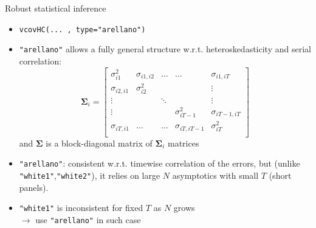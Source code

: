 \documentclass{beamer}
\begin{document}
\begin{frame}{Robust statistical inference}
\begin{itemize}
    \item \texttt{vcovHC(... , type="arellano")}
    \medskip
    \item \texttt{"arellano"} allows a fully general structure w.r.t. heteroskedasticity and serial correlation:
    $$
    \bm{\Sigma}_i = 
    \begin{bmatrix}
    \sigma_{i1}^2 & \sigma_{i1,i2} & \dots & \dots & \sigma_{i1,iT} \\
    \sigma_{i2,i1} & \sigma_{i2}^2 &       &       & \vdots \\
    \vdots         &               & \ddots &      & \vdots \\
   \vdots         &               &  &  \sigma_{iT-1}^2    & \sigma_{iT-1,iT} \\
   \sigma_{iT,i1}       &   \dots & \dots    &  \sigma_{iT,iT-1}    & \sigma_{iT}^2 \\
    \end{bmatrix}
    $$
    and $\bm{\Sigma}$ is a block-diagonal matrix of $\bm{\Sigma}_i$ matrices
    \smallskip
    \item \texttt{"arellano"}: consistent w.r.t. timewise correlation of the errors, but (unlike \texttt{"white1"},\texttt{"white2"}), it relies on large $N$ asymptotics with small $T$ (short panels).
    \smallskip
    \item \texttt{"white1"} is inconsistent for fixed $T$ as $N$ grows \\$\rightarrow$ use \texttt{"arellano"} in such case 
\end{itemize}
\end{frame}
\end{document}
